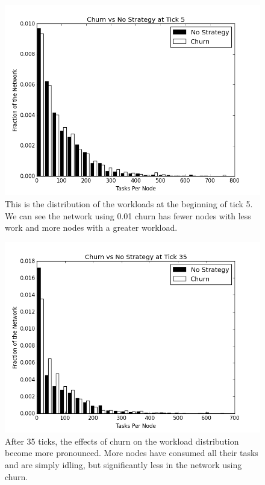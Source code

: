 \documentclass[10pt,conference]{IEEEtran}
\begin{document}
	
	\begin{figure}
		\centering
		\includegraphics[width=0.9\linewidth]{figs/ChurnStableHist5}
		\caption[Workload for churn at tick 5]{This is the distribution of the workloads at the beginning of tick 5.  We can see the network using 0.01 churn has fewer nodes with less work and more nodes with a greater workload.}
		
		\label{fig:churnStableHist5}
	\end{figure}
	
	
	
	\begin{figure}
		\centering
		\includegraphics[width=0.9\linewidth]{figs/ChurnStableHist35}
		\caption[Workload for churn at tick 35]{After 35 ticks, the effects of churn on the workload distribution become more pronounced.  More nodes have consumed all their tasks and are simply idling, but significantly less in the network using churn.}
		\label{fig:churnStableHist35}
	\end{figure}
	
\end{document}
